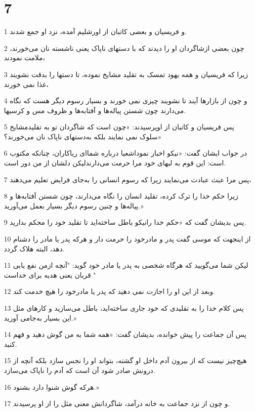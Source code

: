 \chapter{7}

\par 1 و فریسیان و بعضی کاتبان از اورشلیم آمده، نزد او جمع شدند.
\par 2 چون بعضی ازشاگردان او را دیدند که با دستهای ناپاک یعنی ناشسته نان می‌خورند، ملامت نمودند،
\par 3 زیرا که فریسیان و همه یهود تمسک به تقلید مشایخ نموده، تا دستها را بدقت نشویند غذا نمی خورند،
\par 4 و چون از بازارها آیند تا نشویند چیزی نمی خورند و بسیار رسوم دیگر هست که نگاه می‌دارند چون شستن پیاله‌ها و آفتابه‌ها و ظروف مس و کرسیها.
\par 5 پس فریسیان و کاتبان از اوپرسیدند: «چون است که شاگردان تو به تقلیدمشایخ سلوک نمی نمایند بلکه به‌دستهای ناپاک نان می‌خورند؟»
\par 6 در جواب ایشان گفت: «نیکو اخبار نموداشعیا درباره شما‌ای ریاکاران، چنانکه مکتوب است: این قوم به لبهای خود مرا حرمت می‌دارندلیکن دلشان از من دور است.
\par 7 پس مرا عبث عبادت می‌نمایند زیرا که رسوم انسانی را به‌جای فرایض تعلیم می‌دهند،
\par 8 زیرا حکم خدا را ترک کرده، تقلید انسان را نگاه می‌دارند، چون شستن آفتابه‌ها و پیاله‌ها و چنین رسوم دیگر بسیار بعمل می‌آورید.»
\par 9 پس بدیشان گفت که «حکم خدا رانیکو باطل ساخته‌اید تا تقلید خود را محکم بدارید.
\par 10 از اینجهت که موسی گفت پدر و مادرخود را حرمت دار و هر‌که پدر یا مادر را دشنام دهد، البته هلاک گردد.
\par 11 لیکن شما می‌گویید که هرگاه شخصی به پدر یا مادر خود گوید: "آنچه ازمن نفع یابی قربان یعنی هدیه برای خداست "
\par 12 وبعد از این او را اجازت نمی دهید که پدر یا مادرخود را هیچ خدمت کند.
\par 13 پس کلام خدا را به تقلیدی که خود جاری ساخته‌اید، باطل می‌سازید و کارهای مثل این بسیار به‌جامی آورید.»
\par 14 پس آن جماعت را پیش خوانده، بدیشان گفت: «همه شما به من گوش دهید و فهم کنید.
\par 15 هیچ‌چیز نیست که از بیرون آدم داخل او گشته، بتواند او را نجس سازد بلکه آنچه از درونش صادر شود آن است که آدم را ناپاک می‌سازد.
\par 16 هر‌که گوش شنوا دارد بشنود.»
\par 17 و چون از نزد جماعت به خانه در‌آمد، شاگردانش معنی مثل را از او پرسیدند.
